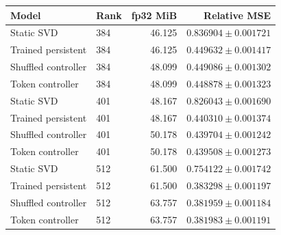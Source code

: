 \begin{tabular}{llrr}
\toprule
Model & Rank & fp32 MiB & Relative MSE \\
\midrule
Static SVD & 384 & 46.125 & $0.836904 \pm 0.001721$ \\
Trained persistent & 384 & 46.125 & $0.449632 \pm 0.001417$ \\
Shuffled controller & 384 & 48.099 & $0.449086 \pm 0.001302$ \\
Token controller & 384 & 48.099 & $0.448878 \pm 0.001323$ \\
Static SVD & 401 & 48.167 & $0.826043 \pm 0.001690$ \\
Trained persistent & 401 & 48.167 & $0.440310 \pm 0.001374$ \\
Shuffled controller & 401 & 50.178 & $0.439704 \pm 0.001242$ \\
Token controller & 401 & 50.178 & $0.439508 \pm 0.001273$ \\
Static SVD & 512 & 61.500 & $0.754122 \pm 0.001742$ \\
Trained persistent & 512 & 61.500 & $0.383298 \pm 0.001197$ \\
Shuffled controller & 512 & 63.757 & $0.381959 \pm 0.001184$ \\
Token controller & 512 & 63.757 & $0.381983 \pm 0.001191$ \\
\bottomrule
\end{tabular}
